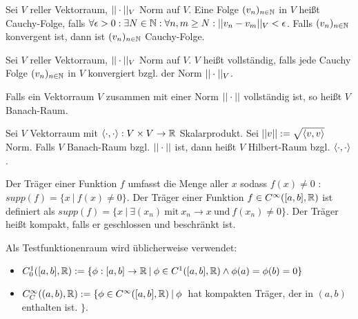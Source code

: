 \begin{definition}
	Sei $V$ reller Vektorraum, $|| \cdot ||_V$ Norm auf $V$. Eine Folge $(v_{n})_{n \in \mathbb{N}}$ in $V$ heißt Cauchy-Folge, falls $\forall \epsilon > 0 : \exists N \in \mathbb{N} : \forall n,m \geq N : ||v_n - v_m||_V < \epsilon$. Falls $(v_{n})_{n \in \mathbb{N}}$ konvergent ist, dann ist $(v_{n})_{n \in \mathbb{N}}$ Cauchy-Folge.
\end{definition}

\begin{definition}
		Sei $V$ reller Vektorraum, $|| \cdot ||_V$ Norm auf $V$. $V$ heißt vollständig, falls jede Cauchy Folge $(v_{n})_{n \in \mathbb{N}}$ in $V$ konvergiert bzgl. der Norm $|| \cdot ||_V$. 
\end{definition}

\begin{definition}
	Falls ein Vektorraum $V$ zusammen mit einer Norm $|| \cdot ||$ vollständig ist, so heißt $V$ Banach-Raum. 
\end{definition}

\begin{definition}
	Sei $V$ Vektorraum mit $\langle \cdot, \cdot \rangle : V \times V \rightarrow \mathbb{R}$ Skalarprodukt. Sei $||v|| := \sqrt{\langle v, v \rangle}$ Norm. Falls $V$ Banach-Raum bzgl. $|| \cdot ||$ ist, dann heißt $V$ Hilbert-Raum bzgl. $\langle \cdot, \cdot \rangle$.
\end{definition}

\begin{definition}[Träger]
	Der Träger einer Funktion $f$ umfasst die Menge aller $x$ sodass $f(x) \neq 0$ : $supp(f) = \{ x \medspace | \medspace f(x) \neq 0 \}$. Der Träger einer Funktion $f \in C^\infty([a,b],\mathbb{R})$ ist definiert als $supp(f) = \{x \medspace | \medspace \exists(x_n) \medspace \text{mit} \medspace x_n \rightarrow x \medspace \text{und} \medspace f(x_n) \neq 0 \}$. Der Träger heißt kompakt, falls er geschlossen und beschränkt ist.
\end{definition}

\begin{definition}[Testfunktionenraum]
	Als Testfunktionenraum wird üblicherweise verwendet:
	\begin{itemize}[noitemsep]
		\item $C_0^1([a,b],\mathbb{R}) := \{ \phi : [a,b] \rightarrow \mathbb{R} \medspace | \medspace \phi \in C^1([a,b],\mathbb{R}) \land \phi(a) = \phi(b) = 0 \}$
		\item $C_C^\infty((a,b),\mathbb{R}) := \{ \phi \in C^\infty([a,b],\mathbb{R}) \medspace | \medspace \phi \medspace$ hat kompakten Träger, der in $(a,b)$ enthalten ist.  $\}$.
	\end{itemize}
\end{definition}

